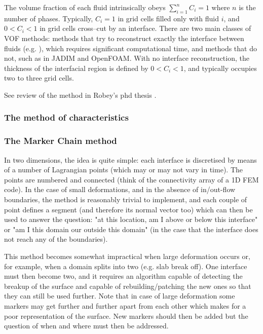 The volume fraction of each fluid intrinsically obeys $\sum \limits_{{i=1}}^n C_i = 1$ where $n$ is the number of phases. 
Typically, $C_i=1$ in grid cells filled only with fluid $i$, and $0<C_i<1$ in grid cells cross--cut by an interface. 
There are two main classes of VOF methods: methods that try to reconstruct exactly the interface between fluids (e.g. \cite{puth18}), which requires significant computational time, and methods that do not, such as in JADIM and OpenFOAM. 
With no interface reconstruction, the thickness of the interfacial region is defined by $0<C_i<1$, and typically occupies two to three grid cells. 

\cite{hini81}\cite{ropu19}

See review of the method in Robey's phd thesis \cite{robe19}.


\subsubsection{The method of characteristics}


\cite{devv00a}

\subsubsection{The Marker Chain method}

In two dimensions, the idea is quite simple: each interface is discretised by means of a number
of Lagrangian points (which may or may not vary in time). The points are numbered and 
connected (think of the connectivity array of a 1D FEM code). In the case of small deformations, 
and in the absence of in/out-flow boundaries, the method is reasonably trivial to implement, and 
each couple of point defines a segment (and therefore its normal vector too) which can then be used
to answer the question: "at this location, am I above or below this interface" or "am I this domain our
outside this domain" (in the case that the interface does not reach any of the boundaries).

This method becomes somewhat impractical when large deformation occurs or, for example, 
when a domain splits into two (e.g. slab break off). One interface must then become two, 
and it requires an algorithm capable of detecting the breakup of the surface and capable 
of rebuilding/patching the new ones so that they can still be used further. 
Note that in case of large deformation some markers may get further and further apart 
from each other which makes for a poor representation of the surface. New markers should then 
be added but the question of when and where must then be addressed.

